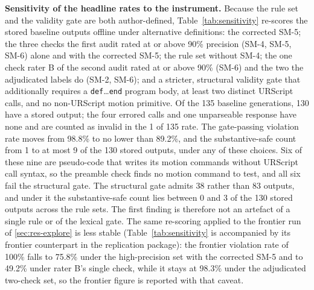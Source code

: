 \documentclass{ieeeaccess}
\begin{document}
\textbf{Sensitivity of the headline rates to the instrument.} Because the rule set and the
validity gate are both author-defined, Table~\ref{tab:sensitivity} re-scores the stored
baseline outputs offline under alternative definitions: the corrected SM-5; the three
checks the first audit rated at or above 90\% precision (SM-4, SM-5, SM-6) alone and with
the corrected SM-5; the rule set without SM-4; the one check rater B of the second audit
rated at or above 90\% (SM-6) and the two the adjudicated labels do (SM-2, SM-6); and a
stricter, structural validity gate that additionally requires a
\texttt{def}\ldots\texttt{end} program body, at least two distinct URScript calls, and no
non-URScript motion primitive. Of the 135 baseline generations, 130 have a stored
output; the four errored calls and one unparseable response have none and are counted
as invalid in the 1 of 135 rate. The gate-passing violation rate moves from 98.8\% to no
lower than 89.2\%, and the substantive-safe count from 1 to at most 9 of the 130 stored
outputs, under any of these choices. Six of these nine are pseudo-code that writes its
motion commands without URScript call syntax, so the preamble check finds no motion
command to test, and all six fail the structural gate. The structural gate admits 38
rather than 83 outputs, and under it the substantive-safe count lies between 0 and 3 of
the 130 stored outputs across the rule sets. The first finding is therefore not an
artefact of a single rule or of the lexical gate. The same re-scoring applied to the
frontier run of \ref{sec:res-explore} is less stable (Table~\ref{tab:sensitivity} is
accompanied by its frontier counterpart in the replication package): the frontier
violation rate of 100\% falls to 75.8\% under the high-precision set with the corrected
SM-5 and to 49.2\% under rater B's single check, while it stays at 98.3\% under the
adjudicated two-check set, so the frontier figure is reported with that caveat.
\end{document}
